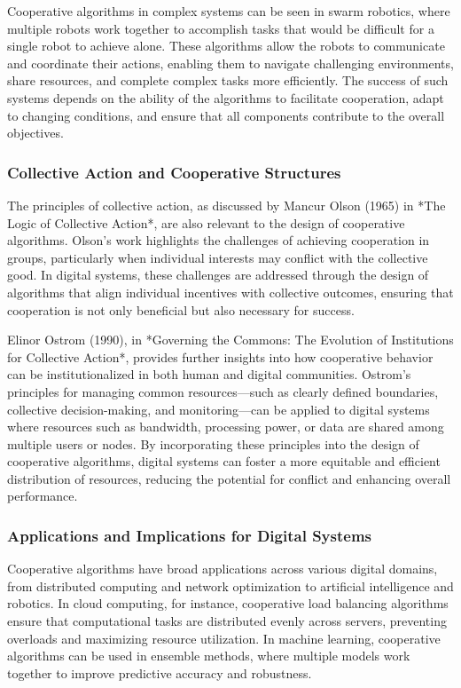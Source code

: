 \documentclass[12pt,twoside]{article}
\begin{document}
Cooperative algorithms in complex systems can be seen in swarm robotics, where multiple robots work together to accomplish tasks that would be difficult for a single robot to achieve alone. These algorithms allow the robots to communicate and coordinate their actions, enabling them to navigate challenging environments, share resources, and complete complex tasks more efficiently. The success of such systems depends on the ability of the algorithms to facilitate cooperation, adapt to changing conditions, and ensure that all components contribute to the overall objectives.

\subsubsection{Collective Action and Cooperative Structures}

The principles of collective action, as discussed by Mancur Olson (1965) in *The Logic of Collective Action*, are also relevant to the design of cooperative algorithms. Olson’s work highlights the challenges of achieving cooperation in groups, particularly when individual interests may conflict with the collective good. In digital systems, these challenges are addressed through the design of algorithms that align individual incentives with collective outcomes, ensuring that cooperation is not only beneficial but also necessary for success.

Elinor Ostrom (1990), in *Governing the Commons: The Evolution of Institutions for Collective Action*, provides further insights into how cooperative behavior can be institutionalized in both human and digital communities. Ostrom’s principles for managing common resources—such as clearly defined boundaries, collective decision-making, and monitoring—can be applied to digital systems where resources such as bandwidth, processing power, or data are shared among multiple users or nodes. By incorporating these principles into the design of cooperative algorithms, digital systems can foster a more equitable and efficient distribution of resources, reducing the potential for conflict and enhancing overall performance.

\subsubsection{Applications and Implications for Digital Systems}

Cooperative algorithms have broad applications across various digital domains, from distributed computing and network optimization to artificial intelligence and robotics. In cloud computing, for instance, cooperative load balancing algorithms ensure that computational tasks are distributed evenly across servers, preventing overloads and maximizing resource utilization. In machine learning, cooperative algorithms can be used in ensemble methods, where multiple models work together to improve predictive accuracy and robustness.
\end{document}
